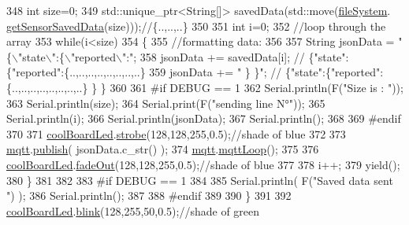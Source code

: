 \begin{DoxyCode}
348         \textcolor{keywordtype}{int} size=0;
349         std::unique\_ptr<String[]> savedData(std::move(\hyperlink{class_cool_board_a42c2586fbb13ff7f06538e9284e8538d}{fileSystem}.
      \hyperlink{class_cool_file_system_a3223ffff4266a6300988fab956d6b4b2}{getSensorSavedData}(size)));\textcolor{comment}{//\{..,..,..\}}
350 
351         \textcolor{keywordtype}{int} i=0;
352         \textcolor{comment}{//loop through the array}
353         \textcolor{keywordflow}{while}(i<size)
354         \{
355             \textcolor{comment}{//formatting data:}
356         
357             String jsonData = \textcolor{stringliteral}{"\{\(\backslash\)"state\(\backslash\)":\{\(\backslash\)"reported\(\backslash\)":"};
358             jsonData += savedData[i]; \textcolor{comment}{// \{"state":\{"reported":\{..,..,..,..,..,..,..,..\}}
359             jsonData += \textcolor{stringliteral}{" \} \}"}; \textcolor{comment}{// \{"state":\{"reported":\{..,..,..,..,..,..,..,..\}  \} \}}
360 
361 \textcolor{preprocessor}{        #if DEBUG == 1 }
362             Serial.println(F(\textcolor{stringliteral}{"Size is : "}));
363             Serial.println(size);
364             Serial.print(F(\textcolor{stringliteral}{"sending line N°"}));
365             Serial.println(i);
366             Serial.println(jsonData);
367             Serial.println();
368 
369 \textcolor{preprocessor}{        #endif}
370 
371             \hyperlink{class_cool_board_a1b1d3c684a5baa56b08486e192fd8e97}{coolBoardLed}.\hyperlink{class_cool_board_led_ad5f0de4c628cbfbf49896042831c64ad}{strobe}(128,128,255,0.5);\textcolor{comment}{//shade of blue}
372         
373             \hyperlink{class_cool_board_a2399f44d7c23c1149a335cb3b46d90f1}{mqtt}.\hyperlink{class_cool_m_q_t_t_ace977b3e90ab14b1199fe5c4fb0a13ec}{publish}( jsonData.c\_str() );
374             \hyperlink{class_cool_board_a2399f44d7c23c1149a335cb3b46d90f1}{mqtt}.\hyperlink{class_cool_m_q_t_t_aa5eaae967b562b62cbcf2b8d81f6e5d5}{mqttLoop}();
375         
376             \hyperlink{class_cool_board_a1b1d3c684a5baa56b08486e192fd8e97}{coolBoardLed}.\hyperlink{class_cool_board_led_a93d545679237e8cc858324367149775c}{fadeOut}(128,128,255,0.5);\textcolor{comment}{//shade of blue}
377             
378             i++;
379             yield();
380         \}       
381 
382 
383 \textcolor{preprocessor}{    #if DEBUG == 1}
384 
385         Serial.println( F(\textcolor{stringliteral}{"Saved data sent "}) );
386         Serial.println();
387     
388 \textcolor{preprocessor}{    #endif}
389 
390     \}
391 
392     \hyperlink{class_cool_board_a1b1d3c684a5baa56b08486e192fd8e97}{coolBoardLed}.\hyperlink{class_cool_board_led_a96e1ea13003eee34c9dbcef340404426}{blink}(128,255,50,0.5);\textcolor{comment}{//shade of green}

\end{DoxyCode}
